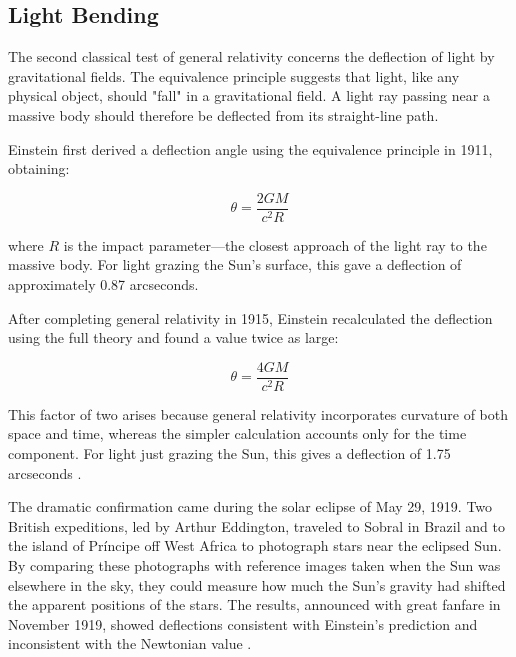 \documentclass[12pt, a4paper]{article}
\begin{document}
	\subsection{Light Bending}
	The second classical test of general relativity concerns the deflection of light by gravitational fields. The equivalence principle suggests that light, like any physical object, should "fall" in a gravitational field. A light ray passing near a massive body should therefore be deflected from its straight-line path.
	
	Einstein first derived a deflection angle using the equivalence principle in 1911, obtaining:
	
	\begin{equation}
		\theta = \frac{2GM}{c^2 R}
		\label{eq:newtonian-deflection}
	\end{equation}
	
	where \(R\) is the impact parameter—the closest approach of the light ray to the massive body. For light grazing the Sun's surface, this gave a deflection of approximately 0.87 arcseconds.
	
	After completing general relativity in 1915, Einstein recalculated the deflection using the full theory and found a value twice as large:
	
	\begin{equation}
		\theta = \frac{4GM}{c^2 R}
		\label{eq:gr-deflection}
	\end{equation}
	
	This factor of two arises because general relativity incorporates curvature of both space and time, whereas the simpler calculation accounts only for the time component. For light just grazing the Sun, this gives a deflection of 1.75 arcseconds \citep{carrollSpacetimeGeometryIntroduction2019}.
	
	The dramatic confirmation came during the solar eclipse of May 29, 1919. Two British expeditions, led by Arthur Eddington, traveled to Sobral in Brazil and to the island of Príncipe off West Africa to photograph stars near the eclipsed Sun. By comparing these photographs with reference images taken when the Sun was elsewhere in the sky, they could measure how much the Sun's gravity had shifted the apparent positions of the stars. The results, announced with great fanfare in November 1919, showed deflections consistent with Einstein's prediction and inconsistent with the Newtonian value \citep{kennefickNoShadowDoubt2019}.
	
\end{document}
